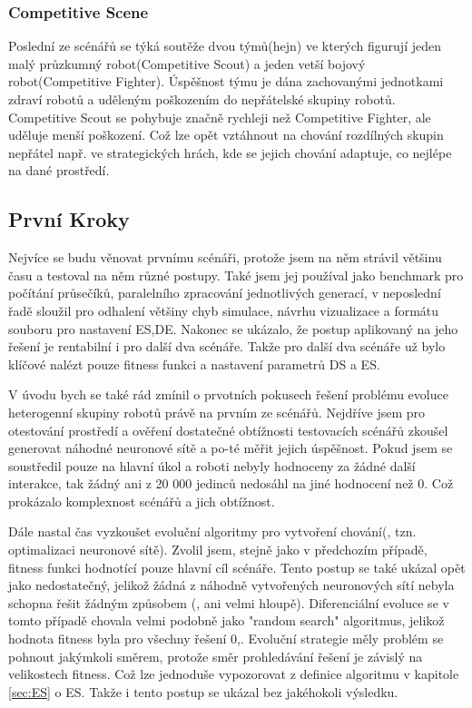 \subsubsection{Competitive Scene}
Poslední ze scénářů se týká soutěže dvou týmů(hejn) ve kterých figurují jeden malý průzkumný robot(Competitive Scout) a jeden vetší bojový robot(Competitive Fighter). Úspěšnost týmu je dána zachovanými jednotkami zdraví robotů a uděleným poškozením do nepřátelské skupiny robotů. Competitive Scout se pohybuje značně rychleji než Competitive Fighter, ale uděluje menší poškození. Což lze opět vztáhnout na chování rozdílných skupin nepřátel např. ve strategických hrách, kde se jejich chování adaptuje, co nejlépe na dané prostředí. 
\subsection{První Kroky}
\par
Nejvíce se budu věnovat prvnímu scénáři, protože jsem na něm strávil většinu času a testoval na něm různé postupy. Také jsem jej používal  jako benchmark pro počítání průsečíků, paralelního zpracování jednotlivých generací, v neposlední řadě sloužil pro odhalení většiny chyb simulace, návrhu vizualizace a formátu souboru pro nastavení ES,DE. Nakonec se ukázalo, že postup aplikovaný na jeho řešení je rentabilní i pro další dva scénáře. Takže pro další dva scénáře už bylo klíčové nalézt pouze fitness funkci a nastavení parametrů DS a ES.
\par
V úvodu bych se také rád zmínil o prvotních pokusech řešení problému evoluce heterogenní skupiny robotů právě na prvním ze scénářů. Nejdříve jsem pro otestování prostředí a ověření dostatečné obtížnosti testovacích scénářů zkoušel generovat náhodné neuronové sítě a po-té měřit jejich úspěšnost. Pokud jsem se soustředil pouze na hlavní úkol a roboti nebyly hodnoceny za žádné další interakce, tak žádný ani z 20 000 jedinců nedosáhl na jiné hodnocení než 0. Což prokázalo komplexnost scénářů a jich obtížnost.
\par 
Dále nastal čas vyzkoušet evoluční algoritmy pro vytvoření chování(, tzn. optimalizaci neuronové sítě). Zvolil jsem, stejně jako v předchozím případě, fitness funkci hodnotící pouze hlavní cíl scénáře. Tento postup se také ukázal opět jako nedostatečný, jelikož žádná z náhodně vytvořených neuronových sítí nebyla schopna řešit žádným způsobem (, ani velmi hloupě). Diferenciální evoluce se v tomto případě chovala velmi podobně jako "random search" algoritmus, jelikož hodnota fitness byla pro  všechny řešení 0,. Evoluční strategie měly problém se pohnout jakýmkoli směrem, protože směr prohledávání řešení je závislý na velikostech fitness. Což lze jednoduše vypozorovat z definice algoritmu v kapitole \ref{sec:ES} o ES. Takže i tento postup se ukázal bez jakéhokoli výsledku. 
